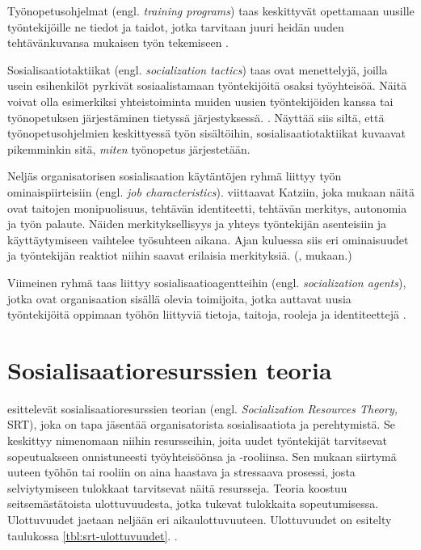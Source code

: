 \documentclass[utf8]{gradu3}
\begin{document}
Työnopetusohjelmat (engl. \textit{training programs}) taas keskittyvät opettamaan uusille työntekijöille ne tiedot ja taidot, jotka tarvitaan juuri heidän uuden tehtävänkuvansa mukaisen työn tekemiseen \parencite{saks-gruman-2012}.

Sosialisaatiotaktiikat (engl. \textit{socialization tactics}) taas ovat menettelyjä, joilla usein esihenkilöt pyrkivät sosiaalistamaan työntekijöitä osaksi työyhteisöä. Näitä voivat olla esimerkiksi yhteistoiminta muiden uusien työntekijöiden kanssa tai työnopetuksen järjestäminen tietyssä järjestyksessä. \parencite{saks-gruman-2012}. Näyttää siis siltä, että työnopetusohjelmien keskittyessä työn sisältöihin, sosialisaatiotaktiikat kuvaavat pikemminkin sitä, \textit{miten} työnopetus järjestetään.

Neljäs organisatorisen sosialisaation käytäntöjen ryhmä liittyy työn ominaispiirteisiin (engl. \textit{job characteristics}). \textcite{saks-gruman-2012} viittaavat Katziin, joka mukaan näitä ovat taitojen monipuolisuus, tehtävän identiteetti, tehtävän merkitys, autonomia ja työn palaute. Näiden merkityksellisyys ja yhteys työntekijän asenteisiin ja käyttäytymiseen vaihtelee työsuhteen aikana. Ajan kuluessa siis eri ominaisuudet ja työntekijän reaktiot niihin saavat erilaisia merkityksiä. (\textcite{katz-1980}, \textcite{saks-gruman-2012} mukaan.)

Viimeinen ryhmä taas liittyy sosialisaatioagentteihin (engl. \textit{socialization agents}), jotka ovat organisaation sisällä olevia toimijoita, jotka auttavat uusia työntekijöitä oppimaan työhön liittyviä tietoja, taitoja, rooleja ja identiteettejä \parencite{saks-gruman-2012}.

\section{Sosialisaatioresurssien teoria}
\label{luku-SRT-teoria}

\textcite{saks-gruman-2012} esittelevät sosialisaatioresurssien teorian (engl. \textit{Socialization Resources Theory,} SRT), joka on tapa jäsentää organisatorista sosialisaatiota ja perehtymistä. Se keskittyy nimenomaan niihin resursseihin, joita uudet työntekijät tarvitsevat sopeutuakseen onnistuneesti työyhteisöönsa ja -rooliinsa. Sen mukaan siirtymä uuteen työhön tai rooliin on aina haastava ja stressaava prosessi, josta selviytymiseen tulokkaat tarvitsevat näitä resursseja. Teoria koostuu seitsemästätoista ulottuvuudesta, jotka tukevat tulokkaita sopeutumisessa. Ulottuvuudet jaetaan neljään eri aikaulottuvuuteen. Ulottuvuudet on esitelty taulukossa \ref{tbl:srt-ulottuvuudet}. \parencite{saks-gruman-2012}.
\end{document}
